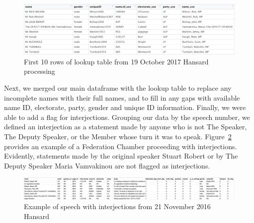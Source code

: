 \documentclass[
  letterpaper,
  DIV=11,
  numbers=noendperiod]{scrartcl}
\begin{document}
\begin{figure}

{\centering \includegraphics[width=4.66667in,height=\textheight]{images/lookup_ex.png}

}

\caption{\label{fig-lookup}First 10 rows of lookup table from 19 October
2017 Hansard processing}

\end{figure}

Next, we merged our main dataframe with the lookup table to replace any
incomplete names with their full names, and to fill in any gaps with
available name ID, electorate, party, gender and unique ID information.
Finally, we were able to add a flag for interjections. Grouping our data
by the speech number, we defined an interjection as a statement made by
anyone who is not The Speaker, The Deputy Speaker, or the Member whose
turn it was to speak. Figure~\ref{fig-interject} provides an example of
a Federation Chamber proceeding with interjections. Evidently,
statements made by the original speaker Stuart Robert or by The Deputy
Speaker Maria Vamvakinou are not flagged as interjections.

\begin{figure}

{\centering \includegraphics{images/interject_ex.png}

}

\caption{\label{fig-interject}Example of speech with interjections from
21 November 2016 Hansard}

\end{figure}
\end{document}
